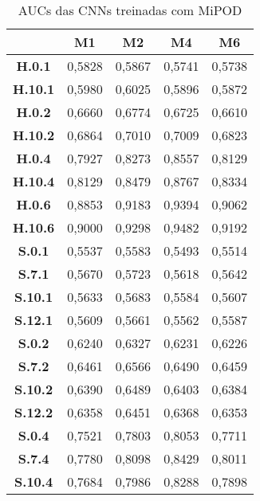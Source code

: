 \begin{apendicesenv}
\begin{table}[!htb]
\centering
\caption{AUCs das CNNs treinadas com MiPOD}
\begin{tabular}{|c|c|c|c|c|}
\hline
\textbf{}       & \textbf{M1} & \textbf{M2} & \textbf{M4} & \textbf{M6} \\ \hline
\textbf{H.0.1}  & 0,5828      & 0,5867      & 0,5741      & 0,5738      \\ \hline
\textbf{H.10.1} & 0,5980      & 0,6025      & 0,5896      & 0,5872      \\ \hline
\textbf{H.0.2}  & 0,6660      & 0,6774      & 0,6725      & 0,6610      \\ \hline
\textbf{H.10.2} & 0,6864      & 0,7010      & 0,7009      & 0,6823      \\ \hline
\textbf{H.0.4}  & 0,7927      & 0,8273      & 0,8557      & 0,8129      \\ \hline
\textbf{H.10.4} & 0,8129      & 0,8479      & 0,8767      & 0,8334      \\ \hline
\textbf{H.0.6}  & 0,8853      & 0,9183      & 0,9394      & 0,9062      \\ \hline
\textbf{H.10.6} & 0,9000      & 0,9298      & 0,9482      & 0,9192      \\ \hline
\textbf{S.0.1}  & 0,5537      & 0,5583      & 0,5493      & 0,5514      \\ \hline
\textbf{S.7.1}  & 0,5670      & 0,5723      & 0,5618      & 0,5642      \\ \hline
\textbf{S.10.1} & 0,5633      & 0,5683      & 0,5584      & 0,5607      \\ \hline
\textbf{S.12.1} & 0,5609      & 0,5661      & 0,5562      & 0,5587      \\ \hline
\textbf{S.0.2}  & 0,6240      & 0,6327      & 0,6231      & 0,6226      \\ \hline
\textbf{S.7.2}  & 0,6461      & 0,6566      & 0,6490      & 0,6459      \\ \hline
\textbf{S.10.2} & 0,6390      & 0,6489      & 0,6403      & 0,6384      \\ \hline
\textbf{S.12.2} & 0,6358      & 0,6451      & 0,6368      & 0,6353      \\ \hline
\textbf{S.0.4}  & 0,7521      & 0,7803      & 0,8053      & 0,7711      \\ \hline
\textbf{S.7.4}  & 0,7780      & 0,8098      & 0,8429      & 0,8011      \\ \hline
\textbf{S.10.4} & 0,7684      & 0,7986      & 0,8288      & 0,7898      \\ \hline

\end{tabular}
\end{table}
\end{apendicesenv}
